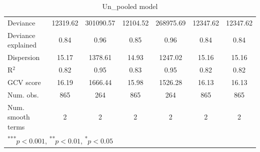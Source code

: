 \documentclass[12pt]{article}
\begin{document}
\begin{table}
\begin{center}
\begin{tabular}{l c c c c c c }
Deviance                             & 12319.62      & 301090.57     & 12104.52      & 268975.69     & 12347.62      & 12347.62      \\
Deviance explained                   & 0.84          & 0.96          & 0.85          & 0.96          & 0.84          & 0.84          \\
Dispersion                           & 15.17         & 1378.61       & 14.93         & 1247.02       & 15.16         & 15.16         \\
R$^2$                                & 0.82          & 0.95          & 0.83          & 0.95          & 0.82          & 0.82          \\
GCV score                            & 16.19         & 1666.44       & 15.98         & 1526.28       & 16.13         & 16.13         \\
Num. obs.                            & 865           & 264           & 865           & 264           & 865           & 865           \\
Num. smooth terms                    & 2             & 2             & 2             & 2             & 2             & 2             \\
\hline
\multicolumn{7}{l}{\scriptsize{\textsuperscript{***}$p<0.001$, 
  \textsuperscript{**}$p<0.01$, 
  \textsuperscript{*}$p<0.05$}}
\end{tabular}
\caption{Un_pooled model}
\label{table:un_pooled}
\end{center}
\end{table}
\end{document}
